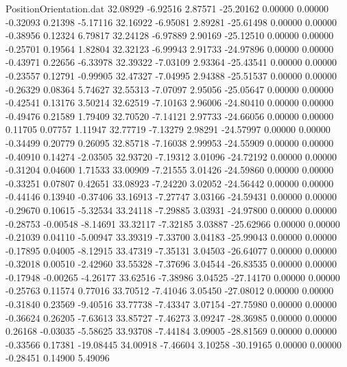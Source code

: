 \begin{filecontents}{PositionOrientation.dat}
  32.08929   -6.92516    2.87571   -25.20162    0.00000    0.00000   -0.32093    0.21398   -5.17116
  32.16922   -6.95081    2.89281   -25.61498    0.00000    0.00000   -0.38956    0.12324    6.79817
  32.24128   -6.97889    2.90169   -25.12510    0.00000    0.00000   -0.25701    0.19564    1.82804
  32.32123   -6.99943    2.91733   -24.97896    0.00000    0.00000   -0.43971    0.22656   -6.33978
  32.39322   -7.03109    2.93364   -25.43541    0.00000    0.00000   -0.23557    0.12791   -0.99905
  32.47327   -7.04995    2.94388   -25.51537    0.00000    0.00000   -0.26329    0.08364    5.74627
  32.55313   -7.07097    2.95056   -25.05647    0.00000    0.00000   -0.42541    0.13176    3.50214
  32.62519   -7.10163    2.96006   -24.80410    0.00000    0.00000   -0.49476    0.21589    1.79409
  32.70520   -7.14121    2.97733   -24.66056    0.00000    0.00000    0.11705    0.07757    1.11947
  32.77719   -7.13279    2.98291   -24.57997    0.00000    0.00000   -0.34499    0.20779    0.26095
  32.85718   -7.16038    2.99953   -24.55909    0.00000    0.00000   -0.40910    0.14274   -2.03505
  32.93720   -7.19312    3.01096   -24.72192    0.00000    0.00000   -0.31204    0.04600    1.71533
  33.00909   -7.21555    3.01426   -24.59860    0.00000    0.00000   -0.33251    0.07807    0.42651
  33.08923   -7.24220    3.02052   -24.56442    0.00000    0.00000   -0.44146    0.13940   -0.37406
  33.16913   -7.27747    3.03166   -24.59431    0.00000    0.00000   -0.29670    0.10615   -5.32534
  33.24118   -7.29885    3.03931   -24.97800    0.00000    0.00000   -0.28753   -0.00548   -8.14691
  33.32117   -7.32185    3.03887   -25.62966    0.00000    0.00000   -0.21039    0.04110   -5.00947
  33.39319   -7.33700    3.04183   -25.99043    0.00000    0.00000   -0.17895    0.04005   -8.12915
  33.47319   -7.35131    3.04503   -26.64077    0.00000    0.00000   -0.32018    0.00510   -2.42960
  33.55328   -7.37696    3.04544   -26.83535    0.00000    0.00000   -0.17948   -0.00265   -4.26177
  33.62516   -7.38986    3.04525   -27.14170    0.00000    0.00000   -0.25763    0.11574    0.77016
  33.70512   -7.41046    3.05450   -27.08012    0.00000    0.00000   -0.31840    0.23569   -9.40516
  33.77738   -7.43347    3.07154   -27.75980    0.00000    0.00000   -0.36624    0.26205   -7.63613
  33.85727   -7.46273    3.09247   -28.36985    0.00000    0.00000    0.26168   -0.03035   -5.58625
  33.93708   -7.44184    3.09005   -28.81569    0.00000    0.00000   -0.33566    0.17381  -19.08445
  34.00918   -7.46604    3.10258   -30.19165    0.00000    0.00000   -0.28451    0.14900    5.49096

\end{filecontents}
